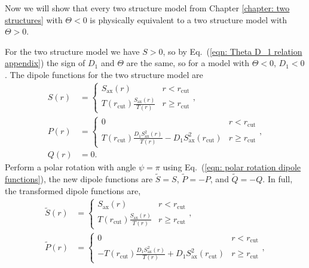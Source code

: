 \documentclass[a4paper,12pt]{report}
\renewcommand{\eqref}[1]{Eq.~({#1})}
\begin{document}
\begin{appendices}
Now we will show that every two structure model from Chapter \ref{chapter: two structures} with $\Theta < 0$ is physically equivalent to a two structure model with $\Theta > 0$.

For the two structure model we have $S>0$, so by \eqref{\ref{eqn: Theta D_1 relation appendix}} the sign of $D_1$ and $\Theta$ are the same, so for a model with $\Theta < 0$, $D_1 < 0$. The dipole functions for the two structure model are
\begin{subequations}
    \begin{align} \label{eqn: two structures transformed dipoles appendix}
        S(r) &=
        \begin{cases}
            S_\text{ax}(r) & r < r_\text{cut} \\
            T(r_\text{cut})\frac{S_\text{ax}(r)}{T(r)}  & r \geq r_\text{cut}
        \end{cases}, \\
        P(r) &=
        \begin{cases}
            0 & r < r_\text{cut} \\
            T(r_\text{cut})\frac{D_1 S_\text{ax}^2(r)}{T(r)} - D_1 S_\text{ax}^2(r_\text{cut}) & r \geq r_\text{cut}
        \end{cases},\label{eqn: two structures final dipoles P appendix} \\
        Q(r) &= 0.
    \end{align}
\end{subequations}
Perform a polar rotation with angle $\psi = \pi$ using \eqref{\ref{eqn: polar rotation dipole functions}}, the new dipole functions are $\tilde{S} = S$, $\tilde{P} = -P$, and $\tilde{Q} = -Q$. In full, the transformed dipole functions are,
\begin{subequations}
    \begin{align}
        \tilde{S}(r) &=
        \begin{cases}
            S_\text{ax}(r) & r < r_\text{cut} \\
            T(r_\text{cut})\frac{S_\text{ax}(r)}{T(r)}  & r \geq r_\text{cut}
        \end{cases}, \\
        \tilde{P}(r) &=
        \begin{cases}
            0 & r < r_\text{cut} \\
            -T(r_\text{cut})\frac{D_1 S_\text{ax}^2(r)}{T(r)} + D_1 S_\text{ax}^2(r_\text{cut}) & r \geq r_\text{cut}
        \end{cases}, \\

\end{align}
\end{subequations}
\end{appendices}
\end{document}
